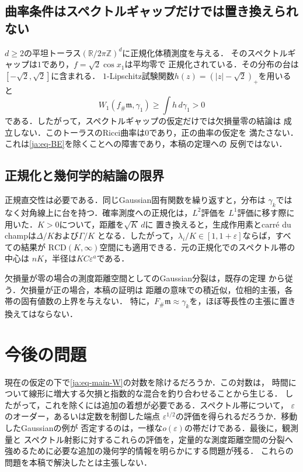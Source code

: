 \documentclass[12pt]{amsart}
\theoremstyle{definition}
\theoremstyle{remark}
\numberwithin{equation}{section}
\newcommand{\R}{\mathbb{R}}
\newcommand{\Z}{\mathbb{Z}}
\newcommand{\m}{\mathfrak m}
\newcommand{\RCD}{\mathrm{RCD}}
\theoremstyle{jpplain}
\begin{document}
\subsection{曲率条件はスペクトルギャップだけでは置き換えられない}
$d\geq2$の平坦トーラス$(\R/2\pi\Z)^d$に正規化体積測度を与える．
そのスペクトルギャップは$1$であり，$f=\sqrt2\cos x_1$は平均零で
正規化されている．その分布の台は$[-\sqrt2,\sqrt2]$に含まれる．
$1$-Lipschitz試験関数$h(z)=(|z|-\sqrt2)_+$を用いると
\[
 W_1(f_\#\m,\gamma_1)\geq\int h\,d\gamma_1>0
\]
である．したがって，スペクトルギャップの仮定だけでは欠損量零の結論は
成立しない．このトーラスのRicci曲率は$0$であり，正の曲率の仮定を
満たさない．これは\eqref{ja:eq-BE}を除くことへの障害であり，本稿の定理への
反例ではない．

\subsection{正規化と幾何学的結論の限界}
正規直交性は必要である．同じGaussian固有関数を繰り返すと，分布は
$\gamma_k$ではなく対角線上に台を持つ．確率測度への正規化は，$L^2$評価を
$L^1$評価に移す際に用いた．$K>0$について，距離を$\sqrt K\,d$に
置き換えると，生成作用素とcarré du champは$\Delta/K$および$\Gamma/K$
となる．したがって，$\lambda_i/K\in[1,1+\varepsilon]$ならば，すべての結果が
$\RCD(K,\infty)$空間にも適用できる．元の正規化でのスペクトル帯の中心は
$nK$，半径は$KC\varepsilon^a$である．

欠損量が零の場合の測度距離空間としてのGaussian分裂は，既存の定理
\cite[Theorem 1.1]{ja:GKKO}から従う．欠損量が正の場合，本稿の証明は
距離の意味での積近似，位相的主張，各帯の固有値数の上界を与えない．
特に，$F_\#\m\approx\gamma_k$を，ほぼ等長性の主張に置き換えてはならない．

\section{今後の問題}

現在の仮定の下で\eqref{ja:eq-main-W}の対数を除けるだろうか．この対数は，
時間について線形に増大する欠損と指数的な混合を釣り合わせることから生じる．
したがって，これを除くには追加の着想が必要である．スペクトル帯について，
$\varepsilon$のオーダー，あるいは定数を制御した端点
$\varepsilon^{1/2}$の評価を得られるだろうか．移動したGaussianの例が
否定するのは，一様な$o(\varepsilon)$の帯だけである．最後に，観測量と
スペクトル射影に対するこれらの評価を，定量的な測度距離空間の分裂へ
強めるために必要な追加の幾何学的情報を明らかにする問題が残る．
これらの問題を本稿で解決したとは主張しない．
\end{document}
